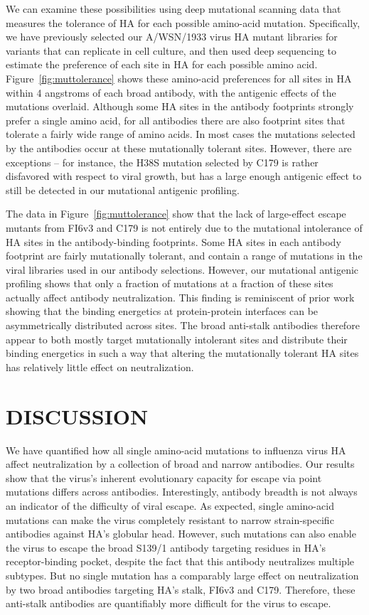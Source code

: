 \documentclass[11pt]{article}
\begin{document}
We can examine these possibilities using deep mutational scanning data that measures the tolerance of HA for each possible amino-acid mutation.
Specifically, we have previously selected our A/WSN/1933 virus HA mutant libraries for variants that can replicate in cell culture, and then used deep sequencing to estimate the preference of each site in HA for each possible amino acid\cite{doud2016accurate}.
Figure~\ref{fig:muttolerance} shows these amino-acid preferences for all sites in HA within 4 angstroms of each broad antibody, with the antigenic effects of the mutations overlaid.
Although some HA sites in the antibody footprints strongly prefer a single amino acid, for all antibodies there are also footprint sites that tolerate a fairly wide range of amino acids.
In most cases the mutations selected by the antibodies occur at these mutationally tolerant sites.
However, there are exceptions -- for instance, the H38S mutation selected by C179 is rather disfavored with respect to viral growth, but has a large enough antigenic effect to still be detected in our mutational antigenic profiling.

The data in Figure~\ref{fig:muttolerance} show that the lack of large-effect escape mutants from FI6v3 and C179 is not entirely due to the mutational intolerance of HA sites in the antibody-binding footprints.
Some HA sites in each antibody footprint are fairly mutationally tolerant, and contain a range of mutations in the viral libraries used in our antibody selections.
However, our mutational antigenic profiling shows that only a fraction of mutations at a fraction of these sites actually affect antibody neutralization.
This finding is reminiscent of prior work showing that the binding energetics at protein-protein interfaces can be asymmetrically distributed across sites\cite{jin1992high,cunningham1993comparison,dall1998mutational}.
The broad anti-stalk antibodies therefore appear to both mostly target mutationally intolerant sites and distribute their binding energetics in such a way that altering the mutationally tolerant HA sites has relatively little effect on neutralization.

\section*{DISCUSSION}
We have quantified how all single amino-acid mutations to influenza virus HA affect neutralization by a collection of broad and narrow antibodies.
Our results show that the virus's inherent evolutionary capacity for escape via point mutations differs across antibodies. 
Interestingly, antibody breadth is not always an indicator of the difficulty of viral escape. 
As expected, single amino-acid mutations can make the virus completely resistant to narrow strain-specific antibodies against HA's globular head.
However, such mutations can also enable the virus to escape the broad S139/1 antibody targeting residues in HA's receptor-binding pocket, despite the fact that this antibody neutralizes multiple subtypes.
But no single mutation has a comparably large effect on neutralization by two broad antibodies targeting HA's stalk, FI6v3 and C179.
Therefore, these anti-stalk antibodies are quantifiably more difficult for the virus to escape.
\end{document}
